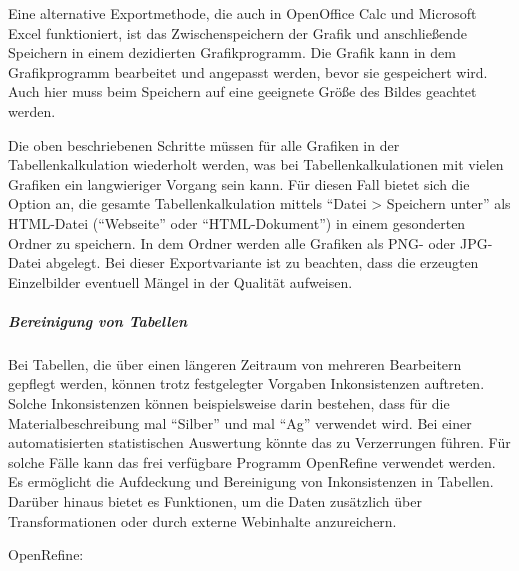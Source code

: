 Eine alternative Exportmethode, die auch in OpenOffice Calc und Microsoft Excel funktioniert, ist das Zwischenspeichern der Grafik und anschließende Speichern in einem dezidierten Grafikprogramm. Die Grafik kann in dem Grafikprogramm bearbeitet und angepasst werden, bevor sie gespeichert wird. Auch hier muss beim Speichern auf eine geeignete Größe des Bildes geachtet werden. 

Die oben beschriebenen Schritte müssen für alle Grafiken in der Tabellenkalkulation wiederholt werden, was bei Tabellenkalkulationen mit vielen Grafiken ein langwieriger Vorgang sein kann. Für diesen Fall bietet sich die Option an, die gesamte Tabellenkalkulation mittels "`Datei > Speichern unter"' als HTML-Datei ("`Webseite"' oder "`HTML-Dokument"') in einem gesonderten Ordner zu speichern. In dem Ordner werden alle Grafiken als PNG- oder JPG-Datei abgelegt. Bei dieser Exportvariante ist zu beachten, dass die erzeugten Einzelbilder eventuell Mängel in der Qualität aufweisen.


\subparagraph{Bereinigung von Tabellen}
Bei Tabellen, die über einen längeren Zeitraum von mehreren Bearbeitern gepflegt werden, können trotz festgelegter Vorgaben Inkonsistenzen auftreten. Solche Inkonsistenzen können beispielsweise darin bestehen, dass für die Materialbeschreibung mal "`Silber"' und mal "`Ag"' verwendet wird. Bei einer automatisierten statistischen Auswertung könnte das zu Verzerrungen führen. Für solche Fälle kann das frei verfügbare Programm OpenRefine verwendet werden. Es ermöglicht die Aufdeckung und Bereinigung von Inkonsistenzen in Tabellen. Darüber hinaus bietet es Funktionen, um die Daten zusätzlich über Transformationen oder durch externe Webinhalte anzureichern.

\begin{flushleft}
	OpenRefine: 
\end{flushleft}


